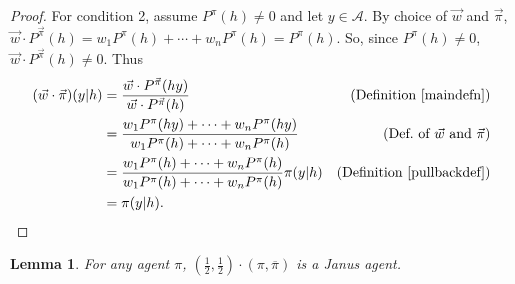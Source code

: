 \documentclass[twoside]{article}
\newtheorem{lemma}[theorem]{Lemma}
\begin{document}
\begin{proof}
        For condition 2,
        assume $P^\pi(h)\not=0$ and let $y\in\mathcal A$.
        By choice of $\vec w$ and $\vec\pi$,
        $\vec w\cdot{P^{\vec\pi}}(h)=w_1P^\pi(h)+\cdots+w_nP^\pi(h)=P^\pi(h)$.
        So, since $P^\pi(h)\not=0$, $\vec w\cdot{P^{\vec\pi}}(h)\not=0$.
        Thus
        \begin{align*}
            (\vec w\cdot\vec\pi)(y|h)
                &= \frac{\vec w\cdot {P^{\vec\pi}}(hy)}{\vec w\cdot{P^{\vec\pi}}(h)}
                    &\mbox{(Definition \ref{maindefn})}\\
                &= \frac{w_1P^\pi(hy)+\cdots+w_nP^\pi(hy)}
                    {w_1P^\pi(h)+\cdots+w_nP^\pi(h)}
                    &\mbox{(Def.\ of $\vec w$ and $\vec\pi$)}\\
                &= \frac{w_1P^\pi(h)+\cdots+w_nP^\pi(h)}{w_1P^\pi(h)+\cdots+w_nP^\pi(h)}
                    \pi(y|h)
                    &\mbox{(Definition \ref{pullbackdef})}\\
                &= \pi(y|h).
        \end{align*}
\end{proof}

\begin{lemma}
\label{reflectionmakesjanuslemma}
    For any agent $\pi$,
    $(\frac12,\frac12)\cdot(\pi,\overline\pi)$ is a Janus agent.
\end{lemma}
\end{document}
